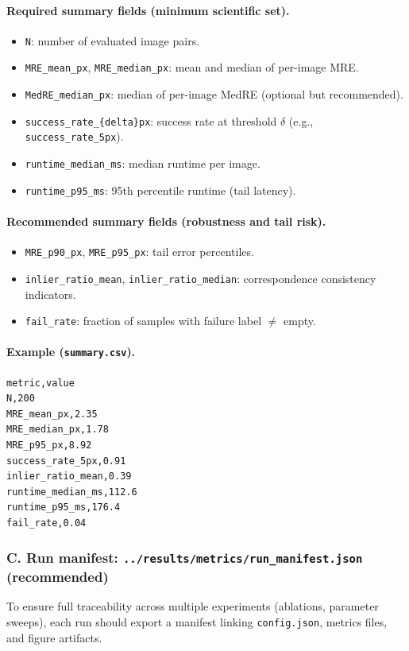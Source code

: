 \paragraph{Required summary fields (minimum scientific set).}
\begin{itemize}
  \item \texttt{N}: number of evaluated image pairs.
  \item \texttt{MRE\_mean\_px}, \texttt{MRE\_median\_px}: mean and median of per-image MRE.
  \item \texttt{MedRE\_median\_px}: median of per-image MedRE (optional but recommended).
  \item \texttt{success\_rate\_\{delta\}px}: success rate at threshold $\delta$ (e.g., \texttt{success\_rate\_5px}).
  \item \texttt{runtime\_median\_ms}: median runtime per image.
  \item \texttt{runtime\_p95\_ms}: 95th percentile runtime (tail latency).
\end{itemize}

\paragraph{Recommended summary fields (robustness and tail risk).}
\begin{itemize}
  \item \texttt{MRE\_p90\_px}, \texttt{MRE\_p95\_px}: tail error percentiles.
  \item \texttt{inlier\_ratio\_mean}, \texttt{inlier\_ratio\_median}: correspondence consistency indicators.
  \item \texttt{fail\_rate}: fraction of samples with failure label \(\neq\) empty.
\end{itemize}

\paragraph{Example (\texttt{summary.csv}).}
\begin{verbatim}
metric,value
N,200
MRE_mean_px,2.35
MRE_median_px,1.78
MRE_p95_px,8.92
success_rate_5px,0.91
inlier_ratio_mean,0.39
runtime_median_ms,112.6
runtime_p95_ms,176.4
fail_rate,0.04
\end{verbatim}

\subsubsection*{C. Run manifest: \texttt{../results/metrics/run\_manifest.json} (recommended)}
To ensure full traceability across multiple experiments (ablations, parameter sweeps), each run should export a manifest linking \texttt{config.json}, metrics files, and figure artifacts.

